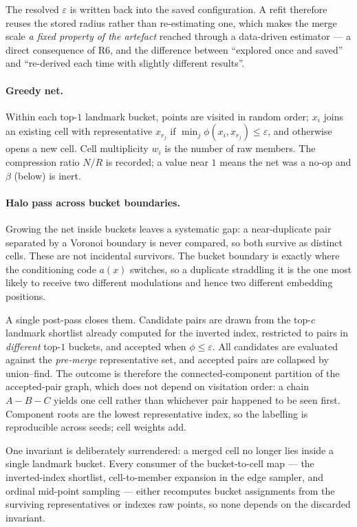 \documentclass[12pt]{iopart}
\theoremstyle{definition}
\theoremstyle{plain}
\theoremstyle{remark}
\begin{document}
The resolved $\varepsilon$ is written back into the saved configuration. A
refit therefore reuses the stored radius rather than re-estimating one, which
makes the merge scale \emph{a fixed property of the artefact} reached through a
data-driven estimator --- a direct consequence of R6, and the difference between
``explored once and saved'' and ``re-derived each time with slightly different
results''.

\paragraph{Greedy net.}
Within each top-$1$ landmark bucket, points are visited in random order; $x_i$
joins an existing cell with representative $x_{r_j}$ if
$\min_j \phi(x_i,x_{r_j})\le\varepsilon$, and otherwise opens a new cell.
Cell multiplicity $w_i$ is the number of raw members. The compression ratio
$N/R$ is recorded; a value near $1$ means the net was a no-op and $\beta$
(below) is inert.

\paragraph{Halo pass across bucket boundaries.}
Growing the net inside buckets leaves a systematic gap: a near-duplicate pair
separated by a Voronoi boundary is never compared, so both survive as distinct
cells. These are not incidental survivors. The bucket boundary is exactly where
the conditioning code $a(x)$ switches, so a duplicate straddling it is the one
most likely to receive two different modulations and hence two different
embedding positions.

A single post-pass closes them. Candidate pairs are drawn from the top-$c$
landmark shortlist already computed for the inverted index, restricted to pairs
in \emph{different} top-$1$ buckets, and accepted when $\phi\le\varepsilon$. All
candidates are evaluated against the \emph{pre-merge} representative set, and
accepted pairs are collapsed by union--find. The outcome is therefore the
connected-component partition of the accepted-pair graph, which does not depend
on visitation order: a chain $A\!-\!B\!-\!C$ yields one cell rather than
whichever pair happened to be seen first. Component roots are the lowest
representative index, so the labelling is reproducible across seeds; cell
weights add.

One invariant is deliberately surrendered: a merged cell no longer lies inside
a single landmark bucket. Every consumer of the bucket-to-cell map --- the
inverted-index shortlist, cell-to-member expansion in the edge sampler, and
ordinal mid-point sampling --- either recomputes bucket assignments from the
surviving representatives or indexes raw points, so none depends on the
discarded invariant.
\end{document}
